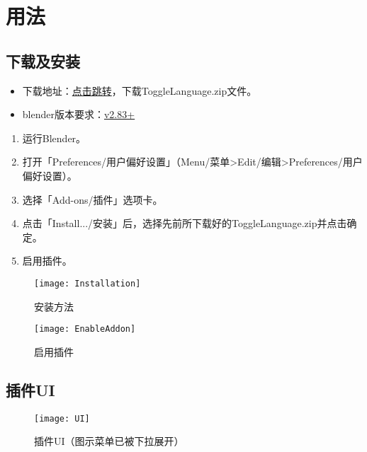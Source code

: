 \documentclass{../../PublicResources/DocClass}
\begin{document}
    \section{用法}

    \subsection{下载及安装}
    \par
    \begin{itemize}
        \item 下载地址：\href{https://github.com/Mister-Kin/ToggleLanguage/releases/latest}{点击跳转}，下载ToggleLanguage.zip文件。
        \item blender版本要求：\href{https://www.blender.org/download/}{v2.83+}
    \end{itemize}

    \begin{enumerate}
        \item 运行Blender。
        \item 打开「Preferences/用户偏好设置」（Menu/菜单>Edit/编辑>Preferences/用户偏好设置）。
        \item 选择「Add-ons/插件」选项卡。
        \item 点击「Install.../安装」后，选择先前所下载好的ToggleLanguage.zip并点击确定。
        \item 启用插件。
    \end{enumerate}

    \begin{figure}[htbp]
        \begin{minipage}[t]{0.45\textwidth}
            \texttt{[image: Installation]}
            \caption{安装方法}
        \end{minipage}
        \qquad
        \begin{minipage}[t]{0.45\textwidth}
            \texttt{[image: EnableAddon]}
            \caption{启用插件}
        \end{minipage}
    \end{figure}

    \subsection{插件UI}
    \label{插件UI小节}
    \begin{figure}[htbp]
        \texttt{[image: UI]}
        \caption{插件UI（图示菜单已被下拉展开）}\label{插件UI}
    \end{figure}
\end{document}

